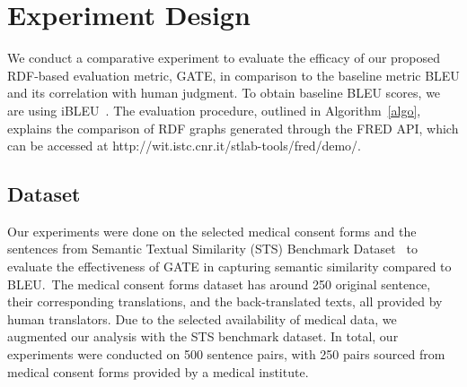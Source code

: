 \documentclass[runningheads]{llncs}
\begin{document}





\section{Experiment Design}\label{experiments}

We conduct a comparative experiment to evaluate the efficacy of our proposed RDF-based evaluation metric, GATE, in comparison to the baseline metric BLEU and its correlation with human judgment. To obtain baseline BLEU scores, we are using iBLEU~\cite{ibleu}. The evaluation procedure, outlined in Algorithm~\ref{algo}, explains the comparison of RDF graphs generated through the FRED API, which can be accessed at http://wit.istc.cnr.it/stlab-tools/fred/demo/.


\subsection{Dataset}

Our experiments were done on the selected medical consent forms and the sentences from Semantic Textual Similarity (STS) Benchmark Dataset~\cite{STSdata} to evaluate the effectiveness of GATE in capturing semantic similarity compared to BLEU.~The medical consent forms dataset has around 250 original sentence, their corresponding translations, and the back-translated texts, all provided by human translators. Due to the selected availability of medical data, we augmented our analysis with the STS benchmark dataset. In total, our experiments were conducted on 500 sentence pairs, with 250 pairs sourced from medical consent forms provided by a medical institute.

\end{document}
